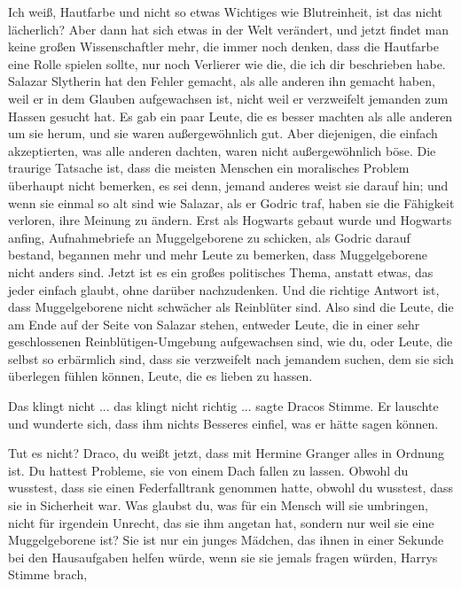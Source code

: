 \glqq{}Ich weiß, Hautfarbe und nicht so etwas Wichtiges wie Blutreinheit, ist das
nicht lächerlich? Aber dann hat sich etwas in der Welt verändert, und jetzt
findet man keine großen Wissenschaftler mehr, die immer noch denken, dass die
Hautfarbe eine Rolle spielen sollte, nur noch Verlierer wie die, die ich dir
beschrieben habe. Salazar Slytherin hat den Fehler gemacht, als alle anderen ihn
gemacht haben, weil er in dem Glauben aufgewachsen ist, nicht weil er
verzweifelt jemanden zum Hassen gesucht hat. Es gab ein paar Leute, die es
besser machten als alle anderen um sie herum, und sie waren außergewöhnlich gut.
Aber diejenigen, die einfach akzeptierten, was alle anderen dachten, waren nicht
außergewöhnlich böse. Die traurige Tatsache ist, dass die meisten Menschen ein
moralisches Problem überhaupt nicht bemerken, es sei denn, jemand anderes weist
sie darauf hin; und wenn sie einmal so alt sind wie Salazar, als er Godric traf,
haben sie die Fähigkeit verloren, ihre Meinung zu ändern. Erst als Hogwarts
gebaut wurde und Hogwarts anfing, Aufnahmebriefe an Muggelgeborene zu schicken,
als Godric darauf bestand, begannen mehr und mehr Leute zu bemerken, dass
Muggelgeborene nicht anders sind. Jetzt ist es ein großes politisches Thema,
anstatt etwas, das jeder einfach glaubt, ohne darüber nachzudenken. Und die
richtige Antwort ist, dass Muggelgeborene nicht schwächer als Reinblüter sind.
Also sind die Leute, die am Ende auf der Seite von Salazar stehen, entweder
Leute, die in einer sehr geschlossenen Reinblütigen-Umgebung aufgewachsen sind,
wie du, oder Leute, die selbst so erbärmlich sind, dass sie verzweifelt nach
jemandem suchen, dem sie sich überlegen fühlen können, Leute, die es lieben zu
hassen.\grqq{}

\glqq{}Das klingt nicht ... das klingt nicht richtig ...\grqq{} sagte Dracos
Stimme. Er lauschte und wunderte sich, dass ihm nichts Besseres einfiel, was er
hätte sagen können.

\glqq{}Tut es nicht? Draco, du weißt jetzt, dass mit Hermine Granger alles in
Ordnung ist. Du hattest Probleme, sie von einem Dach fallen zu lassen. Obwohl du
wusstest, dass sie einen Federfalltrank genommen hatte, obwohl du wusstest, dass
sie in Sicherheit war. Was glaubst du, was für ein Mensch will sie umbringen,
nicht für irgendein Unrecht, das sie ihm angetan hat, sondern nur weil sie eine
Muggelgeborene ist? Sie ist nur ein junges Mädchen, das ihnen in einer Sekunde
bei den Hausaufgaben helfen würde, wenn sie sie jemals fragen würden\grqq{},
Harrys Stimme brach,

